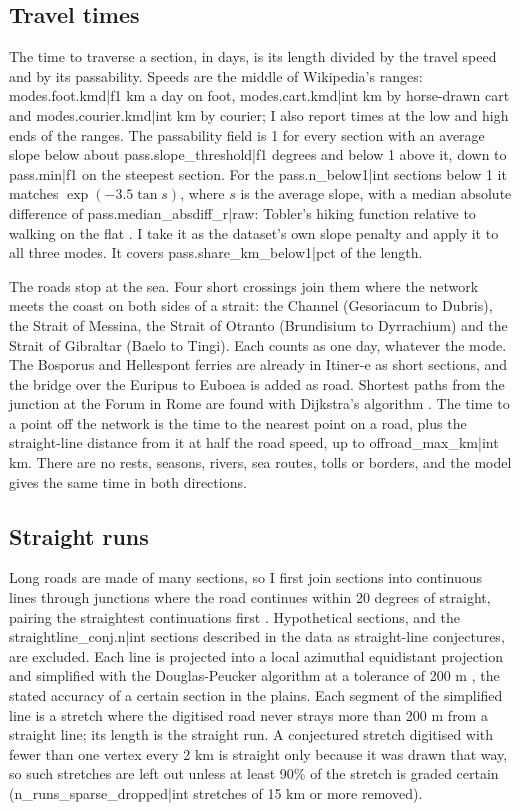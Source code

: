 \documentclass[11pt,a4paper]{article}
\begin{document}
\subsection{Travel times}\label{sec:travel}
The time to traverse a section, in days, is its length divided by the travel speed and by its passability. Speeds are the middle of Wikipedia's ranges: {{modes.foot.kmd|f1}} km a day on foot, {{modes.cart.kmd|int}} km by horse-drawn cart and {{modes.courier.kmd|int}} km by courier; I also report times at the low and high ends of the ranges. The passability field is 1 for every section with an average slope below about {{pass.slope_threshold|f1}} degrees and below 1 above it, down to {{pass.min|f1}} on the steepest section. For the {{pass.n_below1|int}} sections below 1 it matches $\exp(-3.5\tan s)$, where $s$ is the average slope, with a median absolute difference of {{pass.median_absdiff_r|raw}}: Tobler's hiking function relative to walking on the flat \citep{tobler1993}. I take it as the dataset's own slope penalty and apply it to all three modes. It covers {{pass.share_km_below1|pct}} of the length.

The roads stop at the sea. Four short crossings join them where the network meets the coast on both sides of a strait: the Channel (Gesoriacum to Dubris), the Strait of Messina, the Strait of Otranto (Brundisium to Dyrrachium) and the Strait of Gibraltar (Baelo to Tingi). Each counts as one day, whatever the mode. The Bosporus and Hellespont ferries are already in Itiner-e as short sections, and the bridge over the Euripus to Euboea is added as road. Shortest paths from the junction at the Forum in Rome are found with Dijkstra's algorithm \citep{dijkstra1959}. The time to a point off the network is the time to the nearest point on a road, plus the straight-line distance from it at half the road speed, up to {{offroad_max_km|int}} km. There are no rests, seasons, rivers, sea routes, tolls or borders, and the model gives the same time in both directions.

\subsection{Straight runs}
Long roads are made of many sections, so I first join sections into continuous lines through junctions where the road continues within 20 degrees of straight, pairing the straightest continuations first \citep{thomson1999}. Hypothetical sections, and the {{straightline_conj.n|int}} sections described in the data as straight-line conjectures, are excluded. Each line is projected into a local azimuthal equidistant projection and simplified with the Douglas-Peucker algorithm at a tolerance of 200 m \citep{douglas1973}, the stated accuracy of a certain section in the plains. Each segment of the simplified line is a stretch where the digitised road never strays more than 200 m from a straight line; its length is the straight run. A conjectured stretch digitised with fewer than one vertex every 2 km is straight only because it was drawn that way, so such stretches are left out unless at least 90\% of the stretch is graded certain ({{n_runs_sparse_dropped|int}} stretches of 15 km or more removed).
\end{document}
